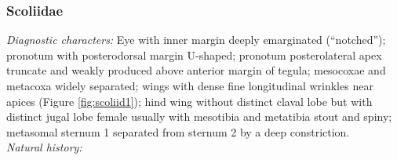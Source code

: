 \documentclass[letterpaper, 11pt]{article}
\begin{document}
\subsubsection{Scoliidae}
\noindent{}\textit{Diagnostic characters:} Eye with inner margin deeply emarginated (``notched''); pronotum with posterodorsal margin U-shaped; pronotum posterolateral apex truncate and weakly produced above anterior margin of tegula; mesocoxae and metacoxa widely separated; wings with dense fine longitudinal wrinkles near apices (Figure \ref{fig:scoliid1}); hind wing without distinct claval lobe but with distinct jugal lobe
female usually with mesotibia and metatibia stout and spiny; metasomal sternum 1 separated from sternum 2 by a deep constriction.\\

\noindent{}\textit{Natural history:} \\
\end{document}
